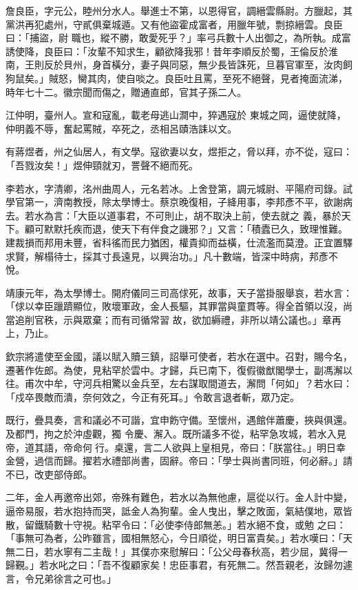 \begin{pinyinscope}
 詹良臣，字元公，睦州分水人。舉進士不第，以恩得官，調縉雲縣尉。方臘起，其黨洪再犯處州，守貳俱棄城遁。又有他盜霍成富者，用臘年號，剽掠縉雲。良臣曰：「捕盜，尉
 職也，縱不勝，敢愛死乎？」率弓兵數十人出御之，為所執。成富誘使降，良臣曰：「汝輩不知求生，顧欲降我邪！昔年李順反於蜀，王倫反於淮南，王則反於貝州，身首橫分，妻子與同惡，無少長皆誅死，旦暮官軍至，汝肉飼狗鼠矣。」賊怒，臠其肉，使自啖之。良臣吐且罵，至死不絕聲，見者掩面流涕，時年七十二。徽宗聞而傷之，贈通直郎，官其子孫二人。



 江仲明，臺州人。宣和寇亂，載老母逃山澗中，猝遇寇於
 東城之岡，逼使就降，仲明義不辱，奮起罵賊，卒死之，丞相呂賾浩誄以文。



 有蔣煜者，州之仙居人，有文學。寇欲妻以女，煜拒之，脅以拜，亦不從，寇曰：「吾戮汝矣！」煜伸頸就刃，詈聲不絕而死。



 李若水，字清卿，洺州曲周人，元名若冰。上舍登第，調元城尉、平陽府司錄。試學官第一，濟南教授，除太學博士。蔡京晚復相，子絳用事，李邦彥不平，欲謝病去。若水為言：「大臣以道事君，不可則止，胡不取決上前，使去就之
 義，暴於天下。顧可默默托疾而退，使天下有伴食之譏邪？」又言：「積蠹已久，致理惟難。建裁損而邦用未豐，省科徭而民力猶困，權貴抑而益橫，仕流濫而莫澄。正宜置驛求賢，解榻待士，採其寸長遠見，以興治功。」凡十數端，皆深中時病，邦彥不悅。



 靖康元年，為太學博士。開府儀同三司高俅死，故事，天子當掛服舉哀，若水言：「俅以幸臣躐躋顯位，敗壞軍政，金人長驅，其罪當與童貫等。得全首領以沒，尚當追削官秩，示與眾棄；而有司循常習
 故，欲加縟禮，非所以靖公議也。」章再上，乃止。



 欽宗將遣使至金國，議以賦入贖三鎮，詔舉可使者，若水在選中。召對，賜今名，遷著作佐郎。為使，見粘罕於雲中。才歸，兵已南下，復假徽猷閣學士，副馮澥以往。甫次中牟，守河兵相驚以金兵至，左右謀取間道去，澥問「何如」？若水曰：「戍卒畏敵而潰，奈何效之，今正有死耳。」令敢言退者斬，眾乃定。



 既行，疊具奏，言和議必不可諧，宜申飭守備。至懷州，遇館伴蕭慶，挾與俱還。及都門，拘之於沖虛觀，獨
 令慶、澥入。既所議多不從，粘罕急攻城，若水入見帝，道其語，帝命何𬃄行。桌還，言二人欲與上皇相見，帝曰：「朕當往。」明日幸金營，過信而歸。擢若水禮部尚書，固辭。帝曰：「學士與尚書同班，何必辭。」請不已，改吏部侍郎。



 二年，金人再邀帝出郊，帝殊有難色，若水以為無他慮，扈從以行。金人計中變，逼帝易服，若水抱持而哭，詆金人為狗輩。金人曳出，擊之敗面，氣結僕地，眾皆散，留鐵騎數十守視。粘罕令曰：「必使李侍郎無恙。」若水絕不食，或勉
 之曰：「事無可為者，公昨雖言，國相無怒心，今日順從，明日富貴矣。」若水嘆曰：「天無二日，若水寧有二主哉！」其僕亦來慰解曰：「公父母春秋高，若少屈，冀得一歸覲。」若水叱之曰：「吾不復顧家矣！忠臣事君，有死無二。然吾親老，汝歸勿遽言，令兄弟徐言之可也。」




\end{pinyinscope}
